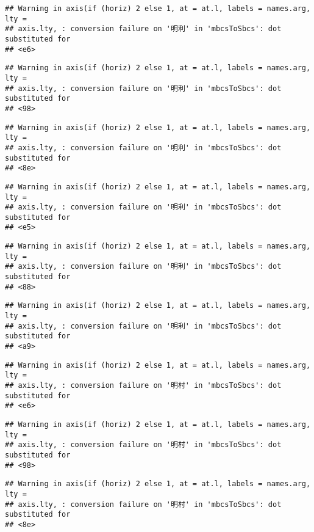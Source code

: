 \documentclass[
]{article}
\begin{document}
\begin{verbatim}
## Warning in axis(if (horiz) 2 else 1, at = at.l, labels = names.arg, lty =
## axis.lty, : conversion failure on '明利' in 'mbcsToSbcs': dot substituted for
## <e6>
\end{verbatim}

\begin{verbatim}
## Warning in axis(if (horiz) 2 else 1, at = at.l, labels = names.arg, lty =
## axis.lty, : conversion failure on '明利' in 'mbcsToSbcs': dot substituted for
## <98>
\end{verbatim}

\begin{verbatim}
## Warning in axis(if (horiz) 2 else 1, at = at.l, labels = names.arg, lty =
## axis.lty, : conversion failure on '明利' in 'mbcsToSbcs': dot substituted for
## <8e>
\end{verbatim}

\begin{verbatim}
## Warning in axis(if (horiz) 2 else 1, at = at.l, labels = names.arg, lty =
## axis.lty, : conversion failure on '明利' in 'mbcsToSbcs': dot substituted for
## <e5>
\end{verbatim}

\begin{verbatim}
## Warning in axis(if (horiz) 2 else 1, at = at.l, labels = names.arg, lty =
## axis.lty, : conversion failure on '明利' in 'mbcsToSbcs': dot substituted for
## <88>
\end{verbatim}

\begin{verbatim}
## Warning in axis(if (horiz) 2 else 1, at = at.l, labels = names.arg, lty =
## axis.lty, : conversion failure on '明利' in 'mbcsToSbcs': dot substituted for
## <a9>
\end{verbatim}

\begin{verbatim}
## Warning in axis(if (horiz) 2 else 1, at = at.l, labels = names.arg, lty =
## axis.lty, : conversion failure on '明村' in 'mbcsToSbcs': dot substituted for
## <e6>
\end{verbatim}

\begin{verbatim}
## Warning in axis(if (horiz) 2 else 1, at = at.l, labels = names.arg, lty =
## axis.lty, : conversion failure on '明村' in 'mbcsToSbcs': dot substituted for
## <98>
\end{verbatim}

\begin{verbatim}
## Warning in axis(if (horiz) 2 else 1, at = at.l, labels = names.arg, lty =
## axis.lty, : conversion failure on '明村' in 'mbcsToSbcs': dot substituted for
## <8e>
\end{verbatim}
\end{document}
